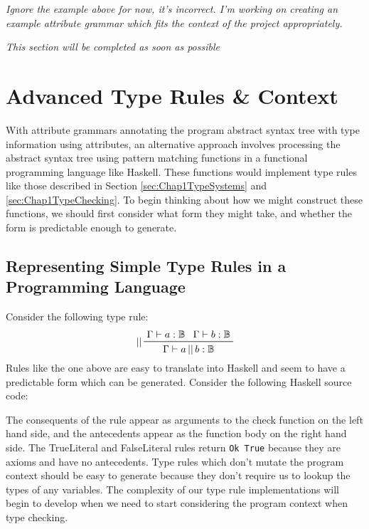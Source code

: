 \documentclass{UoYCSproject}
\begin{document}
\textit{Ignore the example above for now, it's incorrect. I'm working on creating
    an example attribute grammar which fits the context of the project
    appropriately.}

\textit{This section will be completed as soon as possible}

\section{Advanced Type Rules \& Context}
With attribute grammars annotating the program abstract syntax tree with type
information using attributes, an alternative approach involves processing the
abstract syntax tree using pattern matching functions in a functional programming
language like Haskell. These functions would implement type rules like those
described in Section \ref{sec:Chap1TypeSystems} and \ref{sec:Chap1TypeChecking}.
To begin thinking about how we might construct these functions, we should first
consider what form they might take, and whether the form is predictable enough
to generate.

\subsection{Representing Simple Type Rules in a Programming Language}
Consider the following type rule:
\begin{displaymath}
    \prftree[l]{||}{\Gamma \vdash a:\mathbb{B}}{\Gamma \vdash b:\mathbb{B}}{
    \Gamma \vdash a \, || \, b:\mathbb{B}}
\end{displaymath}
Rules like the one above are easy to translate into
Haskell and seem to have a predictable form which can be generated. Consider
the following Haskell source code:
 

The consequents of the rule appear as arguments to the check function on the
left hand side, and the antecedents appear as the function body on the right
hand side. The TrueLiteral and FalseLiteral rules return \lstinline{Ok True}
because they are axioms and have no antecedents. Type rules which don't mutate
the program context should be easy to generate because they don't require us
to lookup the types of any variables. The complexity of our type rule
implementations will begin to develop when we need to start considering the
program context when type checking.
\end{document}
